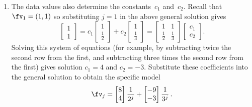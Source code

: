 \begin{example}
\begin{solution}
\begin{enumerate}
\item\label{eg:2expfitd}
The data values also determine the constants~\(c_1\) and~\(c_2\).
Recall that \(\fv_1=(1,1)\) so substituting \(j=1\) in the above general solution gives
\begin{equation*}
\begin{bmatrix} 1\\1 \end{bmatrix}
=c_1\begin{bmatrix} 1\\\tfrac12 \end{bmatrix}
+c_2\begin{bmatrix} 1\\\tfrac13 \end{bmatrix}
=\begin{bmatrix} 1&1\\\tfrac12&\tfrac13 \end{bmatrix}\begin{bmatrix} c_1\\c_2 \end{bmatrix}.
\end{equation*}
Solving this system of equations (for example, by subtracting twice the second row from the first, and subtracting three times the second row from the first) gives solution \(c_1=4\) and \(c_2=-3\).
Substitute these coefficients into the general solution to obtain the specific model
\begin{equation*}
\fv_j =\begin{bmatrix} 8\\4 \end{bmatrix}\frac1{2^j} +\begin{bmatrix} -9\\-3 \end{bmatrix}\frac1{3^j}\,.
\end{equation*}


\end{enumerate}
\end{solution}
\end{example}
